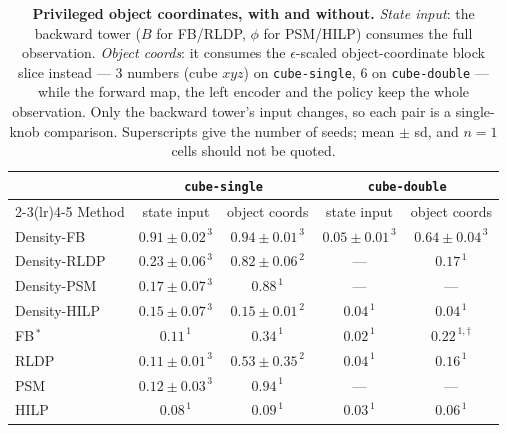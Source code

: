 \documentclass[10pt]{article}
\begin{document}
\begin{table}[h]\centering
\caption{\textbf{Privileged object coordinates, with and without.} \emph{State input}: the
backward tower ($B$ for FB/RLDP, $\phi$ for PSM/HILP) consumes the full observation.
\emph{Object coords}: it consumes the $\epsilon$-scaled object-coordinate block slice
instead --- 3 numbers (cube $xyz$) on \texttt{cube-single}, 6 on \texttt{cube-double} ---
while the forward map, the left encoder and the policy keep the whole observation. Only the
backward tower's input changes, so each pair is a single-knob comparison. Superscripts give
the number of seeds; mean $\pm$ sd, and $n{=}1$ cells should not be quoted.}
\label{tab:privcoord}
\setlength{\tabcolsep}{6pt}
\begin{tabular}{l cc cc}
\toprule
& \multicolumn{2}{c}{\texttt{cube-single}} & \multicolumn{2}{c}{\texttt{cube-double}} \\
\cmidrule(lr){2-3}\cmidrule(lr){4-5}
Method & state input & object coords & state input & object coords \\
\midrule
Density-FB   & $\mathbf{0.91\pm0.02}^{\,3}$ & $\mathbf{0.94\pm0.01}^{\,3}$ & $0.05\pm0.01^{\,3}$ & $\mathbf{0.64\pm0.04}^{\,3}$ \\
Density-RLDP & $0.23\pm0.06^{\,3}$ & $0.82\pm0.06^{\,2}$ & --- & $0.17^{\,1}$ \\
Density-PSM  & $0.17\pm0.07^{\,3}$ & $0.88^{\,1}$        & --- & --- \\
Density-HILP & $0.15\pm0.07^{\,3}$ & $0.15\pm0.01^{\,2}$ & $0.04^{\,1}$ & $0.04^{\,1}$ \\
\midrule
FB$^{\,\ast}$ & $0.11^{\,1}$ & $0.34^{\,1}$ & $0.02^{\,1}$ & $0.22^{\,1,\dagger}$ \\
RLDP  & $0.11\pm0.01^{\,3}$ & $0.53\pm0.35^{\,2}$ & $0.04^{\,1}$ & $0.16^{\,1}$ \\
PSM   & $0.12\pm0.03^{\,3}$ & $0.94^{\,1}$        & --- & --- \\
HILP  & $0.08^{\,1}$        & $0.09^{\,1}$        & $0.03^{\,1}$ & $0.06^{\,1}$ \\
\bottomrule
\end{tabular}


\end{table}
\end{document}
